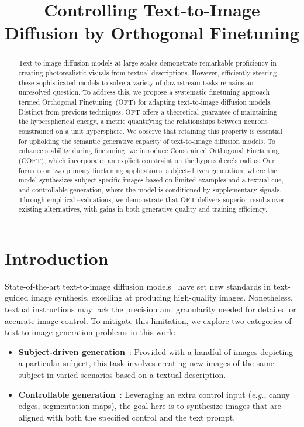 \title{Controlling Text-to-Image Diffusion by Orthogonal Finetuning}

\begin{abstract}
Text-to-image diffusion models at large scales demonstrate remarkable proficiency in creating photorealistic visuals from textual descriptions. However, efficiently steering these sophisticated models to solve a variety of downstream tasks remains an unresolved question. To address this, we propose a systematic finetuning approach termed Orthogonal Finetuning~(OFT) for adapting text-to-image diffusion models. Distinct from previous techniques, OFT offers a theoretical guarantee of maintaining the hyperspherical energy, a metric quantifying the relationships between neurons constrained on a unit hypersphere. We observe that retaining this property is essential for upholding the semantic generative capacity of text-to-image diffusion models. To enhance stability during finetuning, we introduce Constrained Orthogonal Finetuning (COFT), which incorporates an explicit constraint on the hypersphere’s radius. Our focus is on two primary finetuning applications: subject-driven generation, where the model synthesizes subject-specific images based on limited examples and a textual cue, and controllable generation, where the model is conditioned by supplementary signals. Through empirical evaluations, we demonstrate that OFT delivers superior results over existing alternatives, with gains in both generative quality and training efficiency.
\end{abstract}

\section{Introduction}

State-of-the-art text-to-image diffusion models~\cite{saharia2022photorealistic,ramesh2022hierarchical,rombach2022high} have set new standards in text-guided image synthesis, excelling at producing high-quality images. Nonetheless, textual instructions may lack the precision and granularity needed for detailed or accurate image control. To mitigate this limitation, we explore two categories of text-to-image generation problems in this work:

\begin{itemize}[leftmargin=*,nosep]

    \item \textbf{Subject-driven generation}~\cite{ruiz2023dreambooth}: Provided with a handful of images depicting a particular subject, this task involves creating new images of the same subject in varied scenarios based on a textual description.
    \item \textbf{Controllable generation}~\cite{zhang2023adding,mou2023t2i}: Leveraging an extra control input (\emph{e.g.}, canny edges, segmentation maps), the goal here is to synthesize images that are aligned with both the specified control and the text prompt.
\end{itemize}

